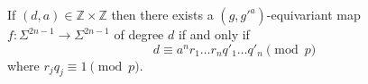 If $(d, a) \in \mathbb{Z} \times \mathbb{Z}$ then there exists a $(g, g'^a)$-equivariant map $f: \Sigma^{2n-1} \to \Sigma^{2n-1}$ of degree $d$ if and only if
$$d \equiv a^n r_1 \dots r_n q'_1 \dots q'_n \pmod{p}$$
where $r_j q_j \equiv 1 \pmod{p}$.
